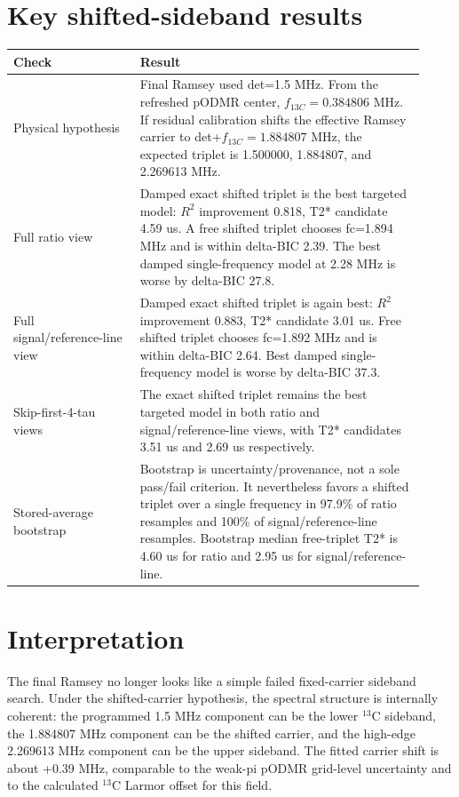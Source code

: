\documentclass[10pt]{article}
\begin{document}
\section*{Key shifted-sideband results}
\begin{tabular}{>{\raggedright\arraybackslash}p{0.29\linewidth} >{\raggedright\arraybackslash}p{0.63\linewidth}}
\toprule
Check & Result \\
\midrule
Physical hypothesis & Final Ramsey used det=1.5 MHz. From the refreshed pODMR center, $f_{13C}=0.384806$ MHz. If residual calibration shifts the effective Ramsey carrier to det+$f_{13C}=1.884807$ MHz, the expected triplet is 1.500000, 1.884807, and 2.269613 MHz. \\
Full ratio view & Damped exact shifted triplet is the best targeted model: $R^2$ improvement 0.818, T2* candidate 4.59 us. A free shifted triplet chooses fc=1.894 MHz and is within delta-BIC 2.39. The best damped single-frequency model at 2.28 MHz is worse by delta-BIC 27.8. \\
Full signal/reference-line view & Damped exact shifted triplet is again best: $R^2$ improvement 0.883, T2* candidate 3.01 us. Free shifted triplet chooses fc=1.892 MHz and is within delta-BIC 2.64. Best damped single-frequency model is worse by delta-BIC 37.3. \\
Skip-first-4-tau views & The exact shifted triplet remains the best targeted model in both ratio and signal/reference-line views, with T2* candidates 3.51 us and 2.69 us respectively. \\
Stored-average bootstrap & Bootstrap is uncertainty/provenance, not a sole pass/fail criterion. It nevertheless favors a shifted triplet over a single frequency in 97.9\% of ratio resamples and 100\% of signal/reference-line resamples. Bootstrap median free-triplet T2* is 4.60 us for ratio and 2.95 us for signal/reference-line. \\
\bottomrule
\end{tabular}

\section*{Interpretation}
The final Ramsey no longer looks like a simple failed fixed-carrier sideband search. Under the shifted-carrier hypothesis, the spectral structure is internally coherent: the programmed 1.5 MHz component can be the lower $^{13}$C sideband, the 1.884807 MHz component can be the shifted carrier, and the high-edge 2.269613 MHz component can be the upper sideband. The fitted carrier shift is about +0.39 MHz, comparable to the weak-pi pODMR grid-level uncertainty and to the calculated $^{13}$C Larmor offset for this field.
\end{document}
